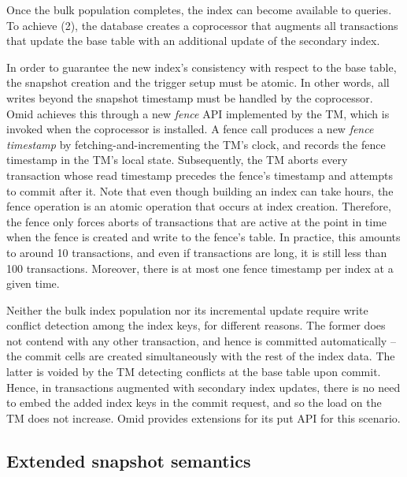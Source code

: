 Once the bulk population completes, the index can become available to queries. 
To achieve (2), the database creates a coprocessor that augments all transactions 
that update the base table with an additional update of the secondary index. 
 
In order to guarantee the new index's consistency with respect to the base table, the snapshot creation 
and the trigger setup must be atomic. In other words, all writes beyond the snapshot   
timestamp must be handled by the coprocessor. Omid achieves this through a new {\em fence\/} API
implemented by the TM, which is  invoked when the coprocessor is installed. 
A fence call produces a new \emph{fence timestamp} by fetching-and-incrementing the TM's clock, and 
records the fence timestamp in the TM's local state.  
Subsequently, the TM aborts every transaction whose read timestamp precedes the fence's 
timestamp and attempts to commit after it. 
Note that even though building an index can take hours, the fence operation is an atomic operation that occurs at index creation. Therefore, the fence only forces aborts of transactions that are active at the point in time when the fence is created and write to the fence's table. In practice, this amounts to around 10 transactions, and even if transactions are long, it is still less than 100 transactions. Moreover, there is at most one fence timestamp per index at a given time.



Neither the bulk index population nor its incremental update require write conflict detection 
among the index keys, for different reasons. The former does not contend with any other 
transaction, and hence is committed automatically -- the commit cells are created simultaneously
with the rest of the index data. The latter is voided by the TM detecting conflicts at the base 
table upon commit. Hence, in transactions augmented with secondary index updates,  
there is no need to embed the added index keys in the commit 
request, and so the load on the TM does not increase. 
Omid provides extensions for its put API for this scenario. 


\subsection{Extended snapshot semantics}
\label{ssec:snapshot}

